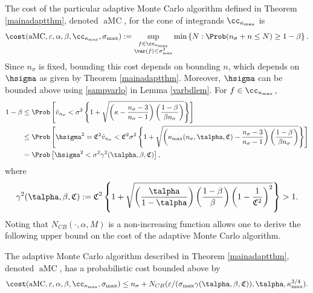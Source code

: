 \documentclass[graybox]{svmult}
\newcommand{\hv}{\hat{v}}
\newcommand{\fudge}{\mathfrak{C}}
\DeclareMathOperator{\aMC}{aMC}
\begin{document}
The cost of the particular adaptive Monte Carlo algorithm defined in Theorem \ref{mainadaptthm}, denoted $\aMC$, for the cone of integrands $\cc_{\kappa_{\max}}$ is
\begin{equation}
\cost(\aMC,\varepsilon,\alpha, \beta, \cc_{\kappa_{\max}}, \sigma_{\max}) := \sup_{\substack{f \in \cc_{\kappa_{\max}}\\ \var(f)\le \sigma^2_{\max}} } \min\left\{N : \Prob(n_{\sigma} + n \le N) \ge 1-\beta  \right \}.
\end{equation}
Since $n_{\sigma}$ is fixed, bounding this cost depends on bounding $n$, which depends on $\hsigma$ as given by Theorem \ref{mainadaptthm}.  Moreover, $\hsigma$ can be bounded above using \eqref{sampvarlo} in Lemma \ref{varbdlem}.  For $f \in \cc_{\kappa_{\max}}$, 
\begin{align*}
1-\beta & \le \Prob\left[\hv_{n_{\sigma}} < \sigma^2 \left\{1 + \sqrt{\left ( \kappa  - \frac{n_{\sigma}-3}{n_{\sigma}-1}\right)\left(\frac{1-\beta}{\beta n_{\sigma}}\right)}\right\} \right] \\
& \le \Prob\left[\hsigma^2 = \fudge^2 \hv_{n_{\sigma}} < \fudge^2\sigma^2 \left\{1 + \sqrt{\left ( \kappa_{\max}(n_{\sigma},\talpha,\fudge)  - \frac{n_{\sigma}-3}{n_{\sigma}-1}\right)\left(\frac{1-\beta}{\beta n_{\sigma}}\right)}\right\} \right] \\
& = \Prob\left[\hsigma^2 < \sigma^2 \gamma^2(\talpha,\beta,\fudge) \right],
\end{align*}
where
\[
\gamma^2(\talpha,\beta,\fudge) := \fudge^2 \left\{1 + \sqrt{\left(\frac{ \talpha }{1-\talpha}\right) \left(\frac{1-\beta}{\beta}\right) \left(1 - \frac{1}{\fudge^2}\right)^2}\right\} > 1.
\]
Noting that $N_{CB}(\cdot,\alpha,M)$ is a non-increasing function allows one to derive the following upper bound on the cost of the adaptive Monte Carlo algorithm.

\begin{theorem} \label{costtheorem} The adaptive Monte Carlo algorithm described in Theorem \ref{mainadaptthm}, denoted $\aMC$, has a probabilistic cost bounded above by 
\begin{equation*}
\cost(\aMC,\varepsilon,\alpha, \beta, \cc_{\kappa_{\max}}, \sigma_{\max})
\le n_{\sigma} + N_{CB}(\varepsilon/(\sigma_{\max}\gamma(\talpha,\beta,\fudge)),\talpha,\kappa_{\max}^{3/4}).
\end{equation*} 
\end{theorem}
\end{document}
